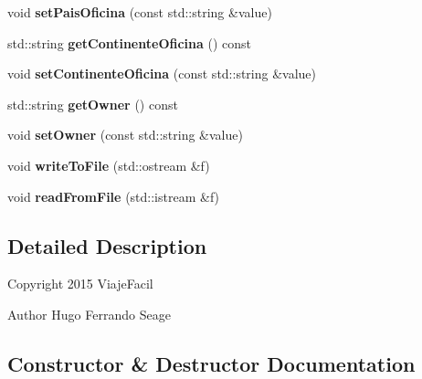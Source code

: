 \begin{DoxyCompactItemize}
\item 
\hypertarget{classentradaHistorial_a7ba50bae0da3388440153d3c8b35863e}{}void {\bfseries set\+Pais\+Oficina} (const std\+::string \&value)\label{classentradaHistorial_a7ba50bae0da3388440153d3c8b35863e}

\item 
\hypertarget{classentradaHistorial_a636f820854ec922bd6fd22e38e5acb84}{}std\+::string {\bfseries get\+Continente\+Oficina} () const \label{classentradaHistorial_a636f820854ec922bd6fd22e38e5acb84}

\item 
\hypertarget{classentradaHistorial_affde03b37e865a5e086c6191b801a1b8}{}void {\bfseries set\+Continente\+Oficina} (const std\+::string \&value)\label{classentradaHistorial_affde03b37e865a5e086c6191b801a1b8}

\item 
\hypertarget{classentradaHistorial_a81bccc82b3b3295ed258eb3923bca2cc}{}std\+::string {\bfseries get\+Owner} () const \label{classentradaHistorial_a81bccc82b3b3295ed258eb3923bca2cc}

\item 
\hypertarget{classentradaHistorial_a876a1124e1ed5294f1bd20be50f54b4d}{}void {\bfseries set\+Owner} (const std\+::string \&value)\label{classentradaHistorial_a876a1124e1ed5294f1bd20be50f54b4d}

\item 
\hypertarget{classentradaHistorial_ad2afe1c2553f5d58eef96f5457098e52}{}void {\bfseries write\+To\+File} (std\+::ostream \&f)\label{classentradaHistorial_ad2afe1c2553f5d58eef96f5457098e52}

\item 
\hypertarget{classentradaHistorial_a2a60649964199cdd144df321fe631b27}{}void {\bfseries read\+From\+File} (std\+::istream \&f)\label{classentradaHistorial_a2a60649964199cdd144df321fe631b27}

\end{DoxyCompactItemize}


\subsection{Detailed Description}
Copyright 2015 Viaje\+Facil \begin{DoxyAuthor}{Author}
Hugo Ferrando Seage 
\end{DoxyAuthor}


\subsection{Constructor \& Destructor Documentation}
\hypertarget{classentradaHistorial_a899faea9865c1a89fe24306ce634c646}{}
